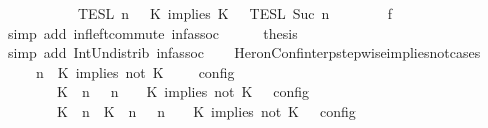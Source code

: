\begin{isabellebody}
\ \ \ \ \ \ \ \ {\isasyminter}\ {\isacharparenleft}{\isasymlbrakk}{\isasymlbrakk}\ {\isasymPsi}\ {\isasymrbrakk}{\isasymrbrakk}\isactrlsub T\isactrlsub E\isactrlsub S\isactrlsub L\isactrlbsup {\isasymge}\ n\isactrlesup \ {\isasyminter}\ {\isasymlbrakk}{\isasymlbrakk}\ {\isacharparenleft}K\ implies\ K\ {\isacharhash}\ {\isasymPhi}\ {\isasymrbrakk}{\isasymrbrakk}\isactrlsub T\isactrlsub E\isactrlsub S\isactrlsub L\isactrlbsup {\isasymge}\ Suc\ n\isactrlesup {\isacharparenright}{\isacartoucheclose}\isanewline
\ \ \ \ \ \ \isamarkupfalse%
\ f{}\ \isamarkupfalse%
\ {\isacharparenleft}simp\ add{\isacharcolon}\ inf{\isacharunderscore}left{\isacharunderscore}commute\ inf{\isacharunderscore}assoc{\isacharparenright}\isanewline
\ \ \ \ \isamarkupfalse%
\ {\isacharquery}thesis\ \isamarkupfalse%
\ {\isacharparenleft}simp\ add{\isacharcolon}\ Int{\isacharunderscore}Un{\isacharunderscore}distrib{}\ inf{\isacharunderscore}assoc{\isacharparenright}\isanewline
\ \ \isamarkupfalse%
\isanewline
{}\isamarkupfalse%
%
\endisatagproof
{\isafoldproof}%
%
\isadelimproof
\isanewline
%
\endisadelimproof
\isanewline
{}\isamarkupfalse%
\ HeronConf{\isacharunderscore}interp{\isacharunderscore}stepwise{\isacharunderscore}implies{\isacharunderscore}not{\isacharunderscore}cases{\isacharcolon}\isanewline
\ \ \ {\isacartoucheopen}{\isasymlbrakk}\ {\isasymGamma}{\isacharcomma}\ n\ {\isasymturnstile}\ {\isacharparenleft}{\isacharparenleft}K\ implies\ not\ K\ {\isacharhash}\ {\isasymPsi}{\isacharparenright}\ {\isasymtriangleright}\ {\isasymPhi}\ {\isasymrbrakk}\isactrlsub c\isactrlsub o\isactrlsub n\isactrlsub f\isactrlsub i\isactrlsub g\isanewline
\ \ \ \ \ \ {\isacharequal}\ {\isasymlbrakk}\ {\isacharparenleft}{\isacharparenleft}K\ {\isasymnot}{\isasymUp}\ n{\isacharparenright}\ {\isacharhash}\ {\isasymGamma}{\isacharparenright}{\isacharcomma}\ n\ {\isasymturnstile}\ {\isasymPsi}\ {\isasymtriangleright}\ {\isacharparenleft}{\isacharparenleft}K\ implies\ not\ K\ {\isacharhash}\ {\isasymPhi}{\isacharparenright}\ {\isasymrbrakk}\isactrlsub c\isactrlsub o\isactrlsub n\isactrlsub f\isactrlsub i\isactrlsub g\isanewline
\ \ \ \ \ \ {\isasymunion}\ {\isasymlbrakk}\ {\isacharparenleft}{\isacharparenleft}K\ {\isasymUp}\ n{\isacharparenright}\ {\isacharhash}\ {\isacharparenleft}K\ {\isasymnot}{\isasymUp}\ n{\isacharparenright}\ {\isacharhash}\ {\isasymGamma}{\isacharparenright}{\isacharcomma}\ n\ {\isasymturnstile}\ {\isasymPsi}\ {\isasymtriangleright}\ {\isacharparenleft}{\isacharparenleft}K\ implies\ not\ K\ {\isacharhash}\ {\isasymPhi}{\isacharparenright}\ {\isasymrbrakk}\isactrlsub c\isactrlsub o\isactrlsub n\isactrlsub f\isactrlsub i\isactrlsub g{\isacartoucheclose}\isanewline

\end{isabellebody}
